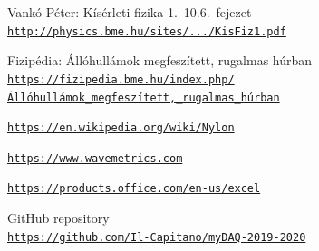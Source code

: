 \documentclass[a4paper,12pt]{article}
\begin{document}
\newpage
\begin{thebibliography}{h!}

Vankó Péter: Kísérleti fizika 1.\ 10.6.\ fejezet \\
\href{http://physics.bme.hu/sites/physics.bme.hu/files/users/BMETE11AF42_kov/KisFiz1.pdf}
{\texttt{http://physics.bme.hu/sites/.../KisFiz1.pdf}}

Fizipédia: Állóhullámok megfeszített, rugalmas húrban \\
\href{https://fizipedia.bme.hu/index.php/\%C3\%81ll\%C3\%B3hull\%C3\%A1mok_megfesz\%C3\%ADtett,_rugalmas_h\%C3\%BArban}
{\texttt{https://fizipedia.bme.hu/index.php/ \\Állóhullámok\_megfeszített,\_rugalmas\_húrban}}

\href{https://en.wikipedia.org/wiki/Nylon}
{\texttt{https://en.wikipedia.org/wiki/Nylon}}

\href{https://www.wavemetrics.com}
{\texttt{https://www.wavemetrics.com}}

\href{https://products.office.com/en-us/excel}
{\texttt{https://products.office.com/en-us/excel}}

GitHub repository \\
\href{https://github.com/Il-Capitano/myDAQ-2019-2020}
{\texttt{https://github.com/Il-Capitano/myDAQ-2019-2020}}

\end{thebibliography}
\end{document}

